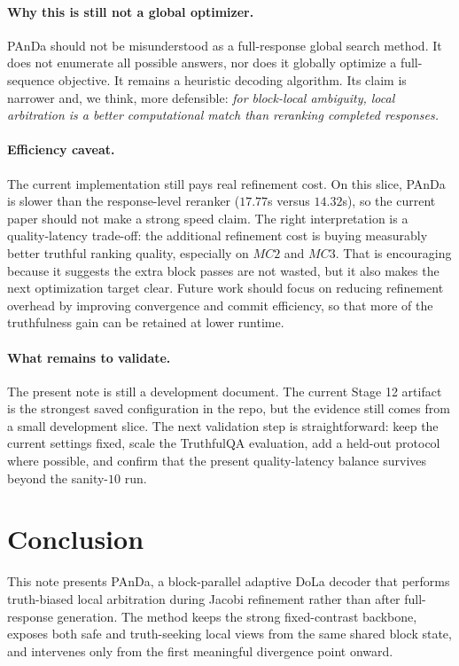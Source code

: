 \documentclass[10pt,twocolumn]{article}
\begin{document}
\paragraph{Why this is still not a global optimizer.}
PAnDa should not be misunderstood as a full-response global search method. It does not enumerate all possible answers, nor does it globally optimize a full-sequence objective. It remains a heuristic decoding algorithm. Its claim is narrower and, we think, more defensible: \emph{for block-local ambiguity, local arbitration is a better computational match than reranking completed responses.}

\paragraph{Efficiency caveat.}
The current implementation still pays real refinement cost. On this slice, PAnDa is slower than the response-level reranker (\(17.77\)s versus \(14.32\)s), so the current paper should not make a strong speed claim. The right interpretation is a quality-latency trade-off: the additional refinement cost is buying measurably better truthful ranking quality, especially on \(MC2\) and \(MC3\). That is encouraging because it suggests the extra block passes are not wasted, but it also makes the next optimization target clear. Future work should focus on reducing refinement overhead by improving convergence and commit efficiency, so that more of the truthfulness gain can be retained at lower runtime.

\paragraph{What remains to validate.}
The present note is still a development document. The current Stage 12 artifact is the strongest saved configuration in the repo, but the evidence still comes from a small development slice. The next validation step is straightforward: keep the current settings fixed, scale the TruthfulQA evaluation, add a held-out protocol where possible, and confirm that the present quality-latency balance survives beyond the sanity-\(10\) run.

\section{Conclusion}
This note presents PAnDa, a block-parallel adaptive DoLa decoder that performs truth-biased local arbitration during Jacobi refinement rather than after full-response generation. The method keeps the strong fixed-contrast backbone, exposes both safe and truth-seeking local views from the same shared block state, and intervenes only from the first meaningful divergence point onward.
\end{document}
